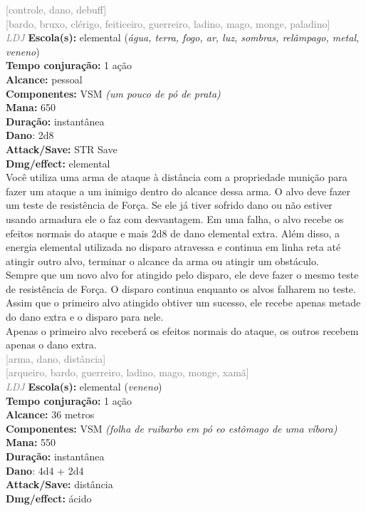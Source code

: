 \documentclass{RPG_Adventure}[2021/10/20]
\begin{document}
{\scriptsize \textcolor{gray}{[controle, dano, debuff]\\}}
{\scriptsize \textcolor{gray}{[bardo, bruxo, clérigo, feiticeiro, guerreiro, ladino, mago, monge, paladino]\\}}
{\tiny \textcolor{gray}{\textit{LDJ}}}
{\small \t \textbf{Escola(s):} elemental (\textit{água, terra, fogo, ar, luz, sombras, relâmpago, metal, veneno})\\\t \textbf{Tempo conjuração:} 1 ação\\\t \textbf{Alcance:} pessoal\\\t \textbf{Componentes:} VSM \textit{(um pouco de pó de prata)}\\\t \textbf{Mana:} 650\\\t \textbf{Duração:} instantânea\\\t \textbf{Dano}: 2d8\\\t \textbf{Attack/Save:} STR Save\\\t \textbf{Dmg/effect:} elemental\\}
{\normalsize Você utiliza uma arma de ataque à distância com a propriedade munição para fazer um ataque a um inimigo dentro do alcance dessa arma. O alvo deve fazer um teste de resistência de Força. Se ele já tiver sofrido dano ou não estiver usando armadura ele o faz com desvantagem. Em uma falha, o alvo recebe os efeitos normais do ataque e mais 2d8 de dano elemental extra. Além disso, a energia elemental utilizada no disparo atravessa e continua em linha reta até atingir outro alvo, terminar o alcance da arma ou atingir um obstáculo.\\Sempre que um novo alvo for atingido pelo disparo, ele deve fazer o mesmo teste de resistência de Força. O disparo continua enquanto os alvos falharem no teste. Assim que o primeiro alvo atingido obtiver um sucesso, ele recebe apenas metade do dano extra e o disparo para nele.\\Apenas o primeiro alvo receberá os efeitos normais do ataque, os outros recebem apenas o dano extra.\\}
{\scriptsize \textcolor{gray}{[arma, dano, distância]\\}}
{\scriptsize \textcolor{gray}{[arqueiro, bardo, guerreiro, ladino, mago, monge, xamã]\\}}
{\tiny \textcolor{gray}{\textit{LDJ}}}
{\small \t \textbf{Escola(s):} elemental (\textit{veneno})\\\t \textbf{Tempo conjuração:} 1 ação\\\t \textbf{Alcance:} 36 metros\\\t \textbf{Componentes:} VSM \textit{(folha de ruibarbo em pó eo estômago de uma víbora)}\\\t \textbf{Mana:} 550\\\t \textbf{Duração:} instantânea\\\t \textbf{Dano}: 4d4 + 2d4\\\t \textbf{Attack/Save:} distância\\\t \textbf{Dmg/effect:} ácido\\}
\end{document}

